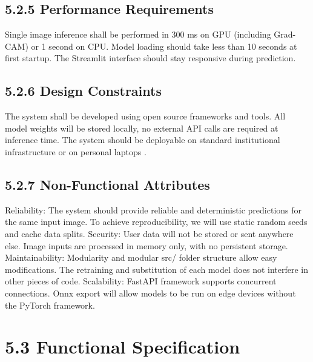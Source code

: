 \documentclass[12pt,a4paper,oneside]{report}
\begin{document}
\subsection*{5.2.5 Performance Requirements}
Single image inference shall be performed in 300 ms on GPU (including Grad-CAM) or 1 second on CPU.
Model loading should take less than 10 seconds at first startup.
The Streamlit interface should stay responsive during prediction.
\subsection*{5.2.6 Design Constraints}
The system shall be developed using open source frameworks and tools.
All model weights will be stored locally, no external API calls are required at inference time.
The system should be deployable on standard institutional infrastructure or on personal laptops .
\subsection*{5.2.7 Non-Functional Attributes}
Reliability: The system should provide reliable and deterministic predictions for the same input image. To achieve reproducibility, we will use static random seeds and cache data splits.
Security: User data will not be stored or sent anywhere else. Image inputs are processed in memory only, with no persistent storage.
Maintainability: Modularity and modular src/ folder structure allow easy modifications. The retraining and substitution of each model does not interfere in other pieces of code.
Scalability: FastAPI framework supports concurrent connections. Onnx export will allow models to be run on edge devices without the PyTorch framework.
\section*{5.3 Functional Specification}
\end{document}
